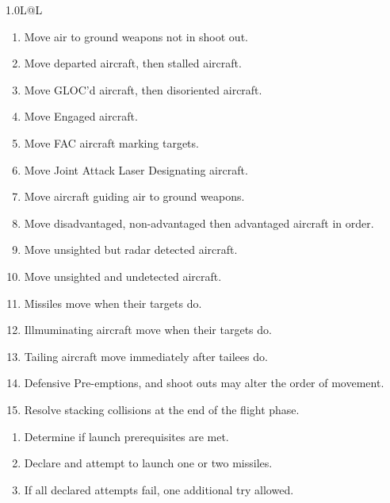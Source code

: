 \begin{twocolumntablefloat}
\begin{twocolumntable}
\begin{tabularx}{1.0\linewidth}{L@{\hspace{\columnsep}}L}
\begin{enumerate}[nosep]
    \item Move air to ground weapons not in shoot out.
    \item Move departed aircraft, then stalled aircraft.
    \item Move GLOC'd aircraft, then disoriented aircraft.
    \item Move Engaged aircraft.
    \item Move FAC aircraft marking targets.
    \item Move Joint Attack Laser Designating aircraft.
    \item Move aircraft guiding air to ground weapons.
    \item Move disadvantaged, non-advantaged then advantaged aircraft in order.
    \item Move unsighted but radar detected aircraft.
    \item Move unsighted and undetected aircraft.
    \item[--] Missiles move when their targets do.
    \item[--] Illmuminating aircraft move when their targets do.
    \item[--] Tailing aircraft move immediately after tailees do.
    \item[--] Defensive Pre-emptions, and shoot outs may alter the order of movement.
    \item[--] Resolve stacking collisions at the end of the flight phase.
\end{enumerate}


\begin{enumerate}[nosep]
    \item Determine if launch prerequisites are met.
    \item Declare and attempt to launch one or two missiles.
    \item If all declared attempts fail, one additional try allowed.
\end{enumerate}



\end{tabularx}
\end{twocolumntable}
\end{twocolumntablefloat}
